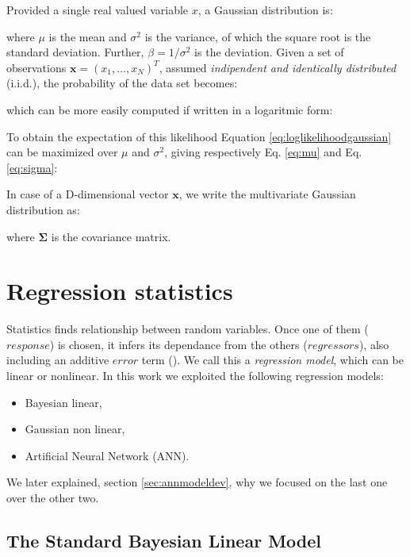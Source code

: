 Provided a single real valued variable $x$, a Gaussian distribution is:

where $\mu$ is the mean and $\sigma^2$ is the variance, of which the square root
is the standard deviation.
Further, $\beta = 1/\sigma^2$ is the deviation.
Given a set of observations $\mathbf{x} = (x_1, \ldots, x_N)^T$, assumed
\textit{indipendent and identically distributed} (i.i.d.), the probability of
the data set becomes:

which can be more easily computed if written in a logaritmic form:

To obtain the expectation of this likelihood Equation
\ref{eq:loglikelihoodgaussian} can be maximized over $\mu$ and $\sigma^2$,
giving respectively Eq. \ref{eq:mu} and Eq. \ref{eq:sigma}:


In case of a D-dimensional vector $\mathbf{x}$, we write the multivariate
Gaussian distribution as:

where $\mathbf{\Sigma}$ is the covariance matrix.


\section{Regression statistics}
\label{sec:regressionstatistics}

Statistics finds relationship between random variables.
Once one of them ($response$) is chosen, it infers its dependance from the
others ($regressors$), also including an additive $error$ term
(\citet{RefWorks:194}). We call this a \textit{regression model}, which can be
linear or nonlinear.
In this work we exploited the following regression models:
\begin{itemize}
  \item{Bayesian linear,}
  \item{Gaussian non linear,}
  \item{Artificial Neural Network (\acs{ANN}).}
\end{itemize}
We later explained, section \ref{sec:annmodeldev}, why we focused on the last
one over the other two.


\subsection{The Standard Bayesian Linear Model}
\label{subsec:standardlinearmodel}

